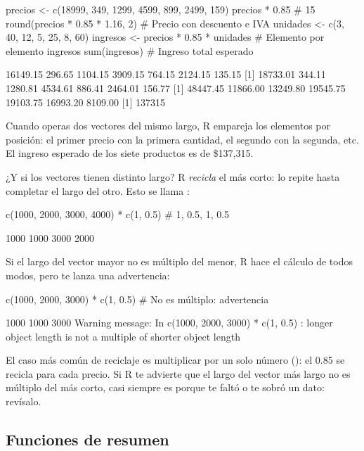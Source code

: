 \begin{rcode}
precios <- c(18999, 349, 1299, 4599, 899, 2499, 159)
precios * 0.85                    # 15%
round(precios * 0.85 * 1.16, 2)   # Precio con descuento e IVA
unidades <- c(3, 40, 12, 5, 25, 8, 60)
ingresos <- precios * 0.85 * unidades   # Elemento por elemento
ingresos
sum(ingresos)                     # Ingreso total esperado
\end{rcode}
\begin{rsalida}
[1] 16149.15   296.65  1104.15  3909.15   764.15  2124.15   135.15
[1] 18733.01   344.11  1280.81  4534.61   886.41  2464.01   156.77
[1] 48447.45 11866.00 13249.80 19545.75 19103.75 16993.20  8109.00
[1] 137315
\end{rsalida}

Cuando operas dos vectores del mismo largo, R empareja los elementos por
posición: el primer precio con la primera cantidad, el segundo con la
segunda, etc. El ingreso esperado de los siete productos es de \$137,315.

¿Y si los vectores tienen distinto largo? R \emph{recicla} el más corto:
lo repite hasta completar el largo del otro. Esto se llama
:

\begin{rcode}
c(1000, 2000, 3000, 4000) * c(1, 0.5)   # 1, 0.5, 1, 0.5
\end{rcode}
\begin{rsalida}
[1] 1000 1000 3000 2000
\end{rsalida}

Si el largo del vector mayor no es múltiplo del menor, R hace el cálculo
de todos modos, pero te lanza una advertencia:

\begin{rnoejecutar}
c(1000, 2000, 3000) * c(1, 0.5)         # No es múltiplo: advertencia
\end{rnoejecutar}
\begin{rsalida}
[1] 1000 1000 3000
Warning message:
In c(1000, 2000, 3000) * c(1, 0.5) :
  longer object length is not a multiple of shorter object length
\end{rsalida}

El caso más común de reciclaje es multiplicar por un solo número
(): el 0.85 se recicla para cada precio. Si R te
advierte que el largo del vector más largo no es múltiplo del más corto,
casi siempre es porque te faltó o te sobró un dato: revísalo.

\subsection{Funciones de resumen}

